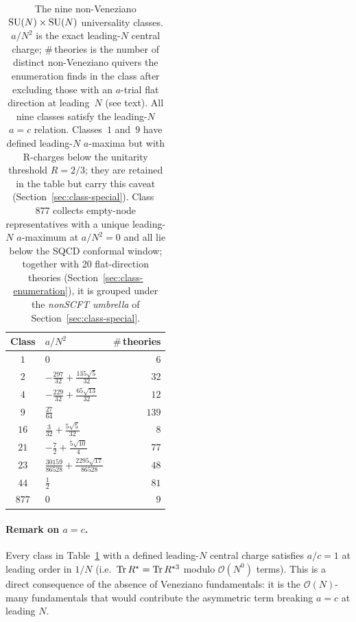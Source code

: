 \begin{table}[h]
  \centering
  \small
  \setlength{\tabcolsep}{6pt}
  \begin{tabular}{clr}
    \toprule
    Class & $a/N^{2}$ & $\#$\,theories \\
    \midrule
    $1$   & $0$                                             & $6$   \\
    $2$   & $-\tfrac{297}{32}+\tfrac{135\sqrt 5}{32}$          & $32$  \\
    $4$   & $-\tfrac{229}{32}+\tfrac{65\sqrt{13}}{32}$         & $12$  \\
    $9$   & $\tfrac{27}{64}$                                   & $139$ \\
    $16$  & $\tfrac{3}{32}+\tfrac{5\sqrt 5}{32}$               & $8$   \\
    $21$  & $-\tfrac{7}{2}+\tfrac{5\sqrt{10}}{4}$              & $77$  \\
    $23$  & $\tfrac{30159}{86528}+\tfrac{2295\sqrt{17}}{86528}$& $48$  \\
    $44$  & $\tfrac{1}{2}$                                  & $81$  \\
    $877$ & $0$                                             & $9$   \\
    \bottomrule
  \end{tabular}
  \caption{The nine non-Veneziano $\mathrm{SU}(N)\times\mathrm{SU}(N)$ universality
    classes.  $a/N^{2}$ is the exact leading-$N$ central charge;
    $\#$\,theories is the number of distinct non-Veneziano quivers the
    enumeration finds in the class after excluding those with an
    $a$-trial flat direction at leading~$N$ (see text).  All nine
    classes satisfy the leading-$N$ $a=c$ relation.  Classes~$1$
    and~$9$ have defined leading-$N$ $a$-maxima but with R-charges
    below the unitarity threshold $R=2/3$; they are retained in the
    table but carry this caveat (Section~\ref{sec:class-special}).
    Class~$877$ collects empty-node representatives with a unique
    leading-$N$ $a$-maximum at $a/N^{2}=0$ and all lie below the SQCD
    conformal window; together with 20 flat-direction theories
    (Section~\ref{sec:class-enumeration}), it is grouped under the
    \emph{nonSCFT umbrella} of Section~\ref{sec:class-special}.}
  \label{tab:nine-classes}
\end{table}

\paragraph{Remark on $a=c$.}
Every class in Table~\ref{tab:nine-classes} with a defined leading-$N$
central charge satisfies $a/c=1$ at leading order in $1/N$ (i.e.\
$\operatorname{Tr} R^{\star}=\operatorname{Tr} R^{\star 3}$ modulo $\mathcal O(N^{0})$ terms).
This is a direct consequence of the absence of Veneziano fundamentals:
it is the $\mathcal O(N)$-many fundamentals that would contribute the
asymmetric term breaking $a=c$ at leading $N$.

